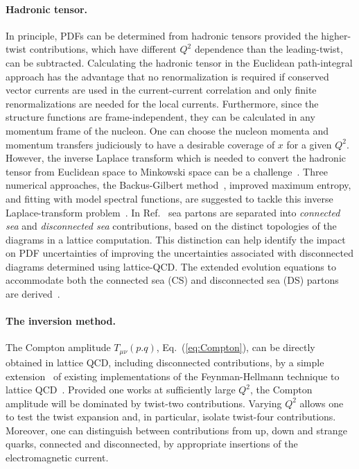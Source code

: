 \paragraph*{Hadronic tensor.} 
In principle, PDFs can be determined from hadronic tensors provided the 
higher-twist contributions, which have different $Q^2$ dependence than the 
leading-twist, can be subtracted. 
%
Calculating the hadronic tensor in the Euclidean path-integral approach
has the advantage that no renormalization is required if conserved vector      
currents are used in the current-current correlation and only finite 
renormalizations are needed for the local currents.
%
Furthermore, since the structure functions are frame-independent, they 
can be calculated in any momentum frame of the nucleon. 
%
One can choose the nucleon momenta and momentum transfers judiciously 
to have a desirable coverage of $x$ for a given $Q^2$. 
%
However, the inverse Laplace transform which is needed to convert the hadronic tensor from Euclidean space to Minkowski space can be a 
challenge~\cite{Liu:1993cv,Liu:1999ak}. 
%
Three numerical approaches, the Backus-Gilbert method~\cite{Hansen:2017mnd}, 
improved maximum entropy, and fitting with model spectral functions, 
are suggested to tackle this inverse Laplace-transform 
problem~\cite{Liu:2016djw}. 
%
In Ref.~\cite{Liu:1993cv} sea partons are separated into {\it connected sea} 
and {\it disconnected sea} contributions, based on the distinct topologies of 
the diagrams in a lattice computation. 
%
This distinction can help identify the impact on PDF uncertainties of 
improving the uncertainties associated with disconnected diagrams determined 
using lattice-QCD.
%
The extended evolution equations to accommodate both the connected sea 
(CS) and disconnected sea (DS) partons are derived~\cite{Liu:2017lpe}.
%

\paragraph*{The inversion method.} 
\label{Sec:InversionMethod}

The Compton amplitude $T_{\mu\nu}(p.q)$, Eq.~(\ref{eq:Compton}), can be
directly obtained in lattice QCD, including disconnected contributions,  
by a simple extension~\cite{Chambers:2017dov} of existing implementations of 
the Feynman-Hellmann technique to lattice QCD~\cite{Horsley:2012pz,
Chambers:2014qaa,Chambers:2015bka}.
%
Provided one works at sufficiently large $Q^2$, the Compton amplitude will be 
dominated by twist-two contributions.
%
Varying $Q^2$ allows one to test the twist expansion and, in particular, 
isolate twist-four contributions. Moreover, one can distinguish between 
contributions from up, down and strange quarks, connected and disconnected, 
by appropriate insertions of the electromagnetic current.

